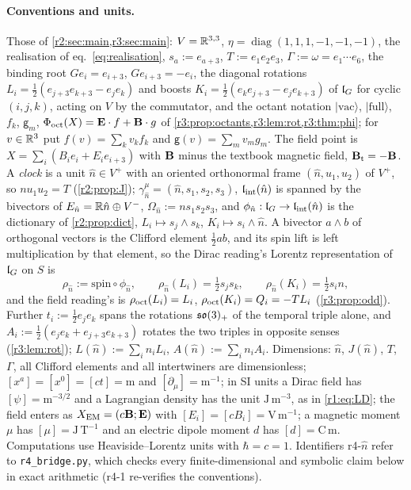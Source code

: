 \paragraph{Conventions and units.} Those of \cref{r2:sec:main,r3:sec:main}: $V=\mathbb{R}^{3,3}$, $\eta=\operatorname{diag}(1,1,1,\allowbreak-1,-1,-1)$, the
realisation of eq.~\cref{eq:realisation}, $s_a:=e_{a+3}$, $T:=e_1e_2e_3$, $\Gamma:=\omega=e_1\cdots e_6$, the binding root $Ge_i=e_{i+3}$,
$Ge_{i+3}=-e_i$, the diagonal rotations $L_i=\tfrac12(e_{j+3}e_{k+3}-e_je_k)$ and boosts $K_i=\tfrac12(e_ke_{j+3}-e_je_{k+3})$ of $\mathfrak l_G$ for cyclic
$(i,j,k)$, acting on $V$ by the commutator, and the octant notation $|\mathrm{vac}\rangle$, $|\mathrm{full}\rangle$, $f_k$, $\mathsf g_m$, $\Phi_{\rm oct}(X)=\mathbf E\cdot f+\mathbf B\cdot g$ of
\cref{r3:prop:octants,r3:lem:rot,r3:thm:phi}; for $v\in\mathbb{R}^3$ put $f(v)=\sum_kv_kf_k$ and $\mathsf g(v)=\sum_mv_mg_m$. The field point is
$X=\sum_i(B_ie_i+E_ie_{i+3})$ with $\mathbf B$ minus the textbook magnetic field, $\mathbf B_{\rm t}=-\mathbf B$. A \emph{clock} is a unit $\hat n\in V^+$ with an oriented
orthonormal frame $(\hat n,u_1,u_2)$ of $V^+$, so $nu_1u_2=T$ (\cref{r2:prop:J}); $\gamma^\mu_{\hat n}=(\hat n,s_1,s_2,s_3)$, $\mathfrak l_{\rm int}(\hat n)$ is spanned by the
bivectors of $E_{\hat n}=\mathbb{R} \hat n\oplus V^-$, $\Omega_{\hat n}:=ns_1s_2s_3$, and $\phi_{\hat n}:\mathfrak l_G\to\mathfrak l_{\rm int}(\hat n)$ is the dictionary of \cref{r2:prop:dict},
$L_i\mapsto s_j\wedge s_k$, $K_i\mapsto s_i\wedge \hat n$. A bivector $a\wedge b$ of orthogonal vectors is the Clifford element $\tfrac12ab$, and its spin
lift is left multiplication by that element, so the Dirac reading's Lorentz representation of $\mathfrak l_G$ on $S$ is
\[
\rho_{\hat n}:=\text{spin}\circ\phi_{\hat n},\qquad \rho_{\hat n}(L_i)=\tfrac12s_js_k,\qquad \rho_{\hat n}(K_i)=\tfrac12s_in ,
\]
and the field reading's is $\rho_{\rm oct}(L_i)=L_i$, $\rho_{\rm oct}(K_i)=Q_i=-TL_i$ (\cref{r3:prop:odd}). Further $t_i:=\tfrac12e_je_k$ spans the
rotations $\mathfrak{so}(3)_+$ of the temporal triple alone, and $A_i:=\tfrac12(e_je_k+e_{j+3}e_{k+3})$ rotates the two triples in opposite senses
(\cref{r3:lem:rot}); $L(\hat n):=\sum_in_iL_i$, $A(\hat n):=\sum_in_iA_i$. Dimensions: $\hat n$, $J(\hat n)$, $T$, $\Gamma$, all Clifford elements and all
intertwiners are dimensionless; $[x^a]=[x^0]=[ct]=\mathrm m$ and $[\partial_\mu]=\mathrm m^{-1}$; in SI units a Dirac field has $[\psi]=\mathrm m^{-3/2}$ and
a Lagrangian density has the unit $\mathrm{J\,m^{-3}}$, as in \cref{r1:eq:LD}; the field enters as $X_{\rm EM}=(c\mathbf B;\mathbf E)$ with $[E_i]=[cB_i]=\mathrm{V\,m^{-1}}$; a
magnetic moment $\mu$ has $[\mu]=\mathrm{J\,T^{-1}}$ and an electric dipole moment $d$ has $[d]=\mathrm{C\,m}$. Computations use Heaviside--Lorentz units
with $\hbar=c=1$. Identifiers r4-$\hat n$ refer to \texttt{r4\_bridge.py}, which checks every finite-dimensional and symbolic claim below
in exact arithmetic (r4-1 re-verifies the conventions).

